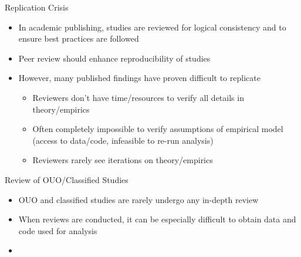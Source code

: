 \documentclass{beamer}
\begin{document}
\begin{frame}{Replication Crisis}
\begin{itemize}
	\item In academic publishing, studies are reviewed for logical consistency and to ensure best practices are followed
	\item Peer review should enhance reproducibility of studies
	\item However, many published findings have proven difficult to replicate
		\begin{itemize}
			\item Reviewers don't have time/resources to verify all details in theory/empirics
			\item Often completely impossible to verify assumptions of empirical model (access to data/code, infeasible to re-run analysis)
			\item Reviewers rarely see iterations on theory/empirics
		\end{itemize}
\end{itemize}
\end{frame}

\begin{frame}{Review of OUO/Classified Studies}
\begin{itemize}
	\item OUO and classified studies are rarely undergo any in-depth review
	\item When reviews are conducted, it can be especially difficult to obtain data and code used for analysis
\end{itemize}
\end{frame}

\begin{frame}{}
\begin{itemize}
	\item 
\end{itemize}
\end{frame}
\end{document}
